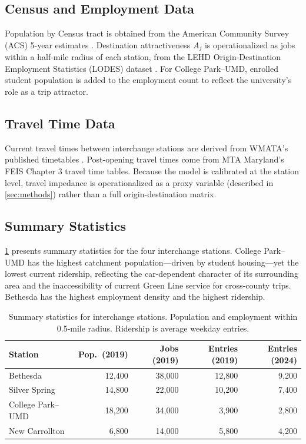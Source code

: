 \documentclass[11pt]{article}
\begin{document}
\subsection{Census and Employment Data}

Population by Census tract is obtained from the American Community Survey
(ACS) 5-year estimates \citep{acs2023}. Destination attractiveness $A_j$
is operationalized as jobs within a half-mile radius of each station, from
the LEHD Origin-Destination Employment Statistics (LODES) dataset
\citep{lodes}. For College Park--UMD, enrolled student population is added
to the employment count to reflect the university's role as a trip attractor.

\subsection{Travel Time Data}

Current travel times between interchange stations are derived from WMATA's
published timetables \citep{wmata_gtfs}. Post-opening travel times come from
MTA Maryland's FEIS Chapter 3 travel time tables. Because the model is
calibrated at the station level, travel impedance is operationalized as a
proxy variable (described in \cref{sec:methods}) rather than a full
origin-destination matrix.

\subsection{Summary Statistics}

\cref{tab:station_summary} presents summary statistics for the four
interchange stations. College Park--UMD has the highest catchment
population---driven by student housing---yet the lowest current ridership,
reflecting the car-dependent character of its surrounding area and the
inaccessibility of current Green Line service for cross-county trips.
Bethesda has the highest employment density and the highest ridership.

\begin{table}[H]
    \centering
    \caption{Summary statistics for interchange stations. Population and
             employment within 0.5-mile radius. Ridership is average weekday
             entries.}
    \label{tab:station_summary}
    \begin{tabular}{lrrrr}
        \toprule
        Station & Pop.\ (2019) & Jobs (2019) & Entries (2019) & Entries (2024) \\
        \midrule
        Bethesda          & 12,400 & 38,000 & 12,800 & 9,200 \\
        Silver Spring     & 14,800 & 22,000 & 10,200 & 7,400 \\
        College Park--UMD & 18,200 & 34,000 & 3,900  & 2,800 \\
        New Carrollton    & 6,800  & 14,000 & 5,800  & 4,200 \\
        \bottomrule
    \end{tabular}
\end{table}
\end{document}
